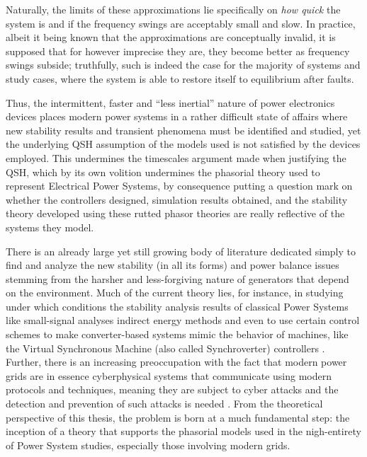 	Naturally, the limits of these approximations lie specifically on \textit{how quick} the system is and if the frequency swings are acceptably small and slow. In practice, albeit it being known that the approximations are conceptually invalid, it is supposed that for however imprecise they are, they become better as frequency swings subside; truthfully, such is indeed the case for the majority of systems and study cases, where the system is able to restore itself to equilibrium after faults.

	Thus, the intermittent, faster and ``less inertial'' nature of power electronics devices places modern power systems in a rather difficult state of affairs where new stability results and transient phenomena must be identified and studied, yet the underlying QSH assumption of the models used is not satisfied by the devices employed. This undermines the timescales argument made when justifying the QSH, which by its own volition undermines the phasorial theory used to represent Electrical Power Systems, by consequence putting a question mark on whether the controllers designed, simulation results obtained, and the stability theory developed using these rutted phasor theories are really reflective of the systems they model. 

	There is an already large yet still growing body of literature dedicated simply to find and analyze the new stability (in all its forms) and power balance issues stemming from the harsher and less-forgiving nature of generators that depend on the environment. Much of the current theory lies, for instance, in studying under which conditions the stability analysis results of classical Power Systems like small-signal analyses  indirect energy methods  and even to use certain control schemes to make converter-based systems mimic the behavior of machines, like the Virtual Synchronous Machine (also called Synchroverter) controllers . Further, there is an increasing preoccupation with the fact that modern power grids are in essence cyberphysical systems that communicate using modern protocols and techniques, meaning they are subject to cyber attacks and the detection and prevention of such attacks is needed . From the theoretical perspective of this thesis, the problem is born at a much fundamental step: the inception of a theory that supports the phasorial models used in the nigh-entirety of Power System studies, especially those involving modern grids.

